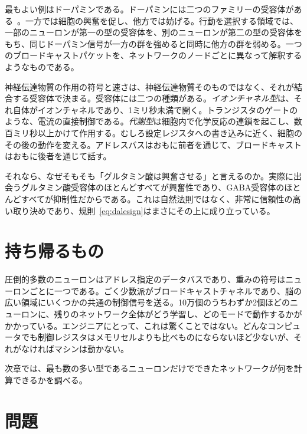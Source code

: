 最もよい例はドーパミンである。ドーパミンには二つのファミリーの受容体がある~\cite{Beaulieu2011}。一方では細胞の興奮を促し、他方では妨げる。行動を選択する領域では、一部のニューロンが第一の型の受容体を、別のニューロンが第二の型の受容体をもち、同じドーパミン信号が一方の群を強めると同時に他方の群を弱める。一つのブロードキャストパケットを、ネットワークのノードごとに異なって解釈するようなものである。

\begin{keyblock}
\begin{proposition}[メッセージの意味を決めるのは受け手]
\label{prop:receptor}
神経伝達物質の作用の符号と速さは、神経伝達物質そのものではなく、それが結合する受容体で決まる。受容体には二つの種類がある。\emph{イオンチャネル型}は、それ自体がイオンチャネルであり、1ミリ秒未満で開く。トランジスタのゲートのような、電流の直接制御である。\emph{代謝型}は細胞内で化学反応の連鎖を起こし、数百ミリ秒以上かけて作用する。むしろ設定レジスタへの書き込みに近く、細胞のその後の動作を変える。アドレスバスはおもに前者を通じて、ブロードキャストはおもに後者を通じて話す。
\end{proposition}
\end{keyblock}

それなら、なぜそもそも「グルタミン酸は興奮させる」と言えるのか。実際に出会うグルタミン酸受容体のほとんどすべてが興奮性であり、GABA受容体のほとんどすべてが抑制性だからである。これは自然法則ではなく、非常に信頼性の高い取り決めであり、規則~\eqref{eq:dalesign}はまさにその上に成り立っている。

\section{持ち帰るもの}

圧倒的多数のニューロンはアドレス指定のデータバスであり、重みの符号はニューロンごとに一つである。ごく少数派がブロードキャストチャネルであり、脳の広い領域にいくつかの共通の制御信号を送る。10万個のうちわずか2個ほどのニューロンに、残りのネットワーク全体がどう学習し、どのモードで動作するかがかかっている。エンジニアにとって、これは驚くことではない。どんなコンピュータでも制御レジスタはメモリセルよりも比べものにならないほど少ないが、それがなければマシンは動かない。

次章では、最も数の多い型であるニューロンだけでできたネットワークが何を計算できるかを調べる。

\section{問題}

